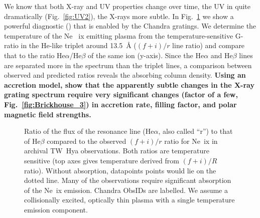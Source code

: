 \documentclass[letterpaper,11pt,twocolumn]{article}
\begin{document}
We know that both X-ray and UV properties change over time, the UV in
quite dramatically (Fig.~\ref{fig:UV2}), the X-rays more
subtle. In Fig.~\ref{fig:allspec} we show a powerful diagnostic
() that is enabled by the Chandra
gratings. We determine the temperature of the Ne~{\sc
  ix} emitting plasma from the temperature-sensitive G-ratio in the He-like triplet around 13.5~\AA{} ($(f+i)/r$ line ratio) and
compare that to the ratio He$\alpha$/He$\beta$ of the same ion
(y-axis). Since the He$\alpha$ and He$\beta$ lines are separated more
in the spectrum than the triplet lines, a comparison between observed
and predicted ratios reveals the absorbing column
density. \textbf{Using an accretion model, \citet{2012ApJ...760L..21B}
  show that the apparently subtle changes in the X-ray grating
  spectrum require very significant changes (factor of a few,
  Fig.~\ref{fig:Brickhouse_3}) in accretion rate, filling factor, and
  polar magnetic field strengths. }

\begin{figure}[h!]
\centering
{}
\caption{Ratio of the flux of the resonance line (He$\alpha$, also
  called ``r'') to that of He$\beta$ compared to the observed
  $(f+i)/r$ ratio for Ne~{\sc ix} in archival TW~Hya observations. Both ratios are temperature
  sensitive (top axes gives temperature derived from $(f+i)/R$
  ratio). Without absorption, datapoints points would lie on the
  dotted line.  Many of the observations require significant
  absorption of the Ne~{\sc ix} emission. Chandra ObsIDs are labelled. We assume a collisionally excited, optically thin plasma with a single temperature emission component.
\label{fig:allspec} }
\end{figure}
\end{document}
